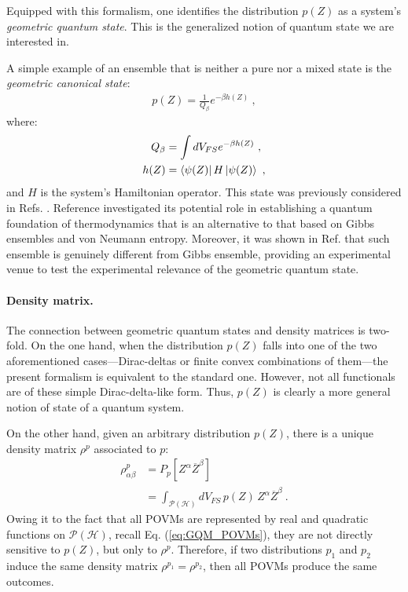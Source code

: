 \documentclass[draft,nofootinbib,prl,twocolumn,showpacs,showkeys,groupaddress,preprintnumbers,floatfix]{revtex4-1}
\newcommand{\1}{\mathbbm{1}}
\newcommand{\intP}{\int_{\mathcal{P}(\mathcal{H})} \!\!\!\!\!\!\!\!\!}
\begin{document}
Equipped with this formalism, one identifies the distribution $p(Z)$ as a
system's \emph{geometric quantum state}. This is the generalized notion of
quantum state we are interested in.

A simple example of an ensemble that is neither a pure nor a mixed state is
the \emph{geometric canonical state}:
\begin{align*}
p(Z) = \frac{1}{Q_\beta} e^{-\beta h(Z)}
  ~,
\end{align*}
where:
\begin{align*}
  Q_\beta & = \int dV_{FS} e^{-\beta h(Z)} ~, \\
  h(Z) & = \bra{\psi(Z)}H\ket{\psi(Z)} ~,
\end{align*}
and $H$ is the system's Hamiltonian operator. This state was previously
considered in Refs. \cite{Brody1998,Brody2016}. Reference \cite{Anza20a}
investigated its potential role in establishing a quantum foundation of
thermodynamics that is an alternative to that based on Gibbs ensembles and von
Neumann entropy. Moreover, it was shown in Ref.\cite{Anza20a} that such ensemble
is genuinely different from Gibbs ensemble, providing an experimental venue to 
test the experimental relevance of the geometric quantum state.


\paragraph*{Density matrix.}
The connection between geometric quantum states and density matrices is
two-fold. On the one hand, when the distribution $p(Z)$ falls into one of the
two aforementioned cases---Dirac-deltas or finite convex combinations of
them---the present formalism is equivalent to the standard one. However, not
all functionals are of these simple Dirac-delta-like form. Thus, $p(Z)$ is
clearly a more general notion of state of a quantum system.

On the other hand, given an arbitrary distribution $p(Z)$, there is a unique
density matrix $\rho^{p}$ associated to $p$:
\begin{align}
\rho^p_{\alpha \beta} & = P_p[Z^\alpha \overline{Z}^\beta] \nonumber \\
  & = \intP dV_{FS} \, p(Z)  \, Z^\alpha \overline{Z}^\beta
  ~.
\label{eq:densitymatrix}
\end{align}
Owing it to the fact that all POVMs are represented by real and quadratic
functions on $\mathcal{P}(\mathcal{H})$, recall Eq. (\ref{eq:GQM_POVMs}), they
are not directly sensitive to $p(Z)$, but only to $\rho^p$. Therefore, if two
distributions $p_1$ and $p_2$ induce the same density matrix $\rho^{p_1} =
\rho^{p_2}$, then all POVMs produce the same outcomes.
\end{document}
